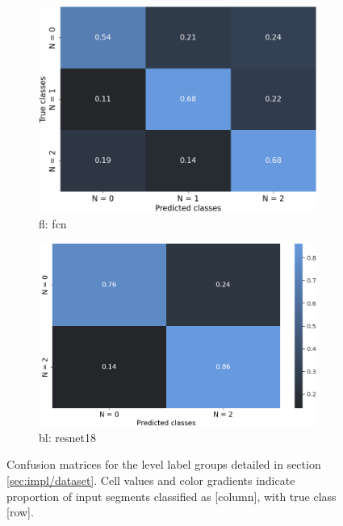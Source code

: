 \begin{figure}[h]
    \begin{subfigure}[b]{0.471\textwidth}
        \centering
        \includegraphics[width=\textwidth]{figures/res_FCN_flevel_cm.png}
        \caption{\acrshort{fl}: \acrlong{fcn}}
        \label{fig:res/conf_flevel}
    \end{subfigure}
    \begin{subfigure}[b]{0.529\textwidth}
        \centering
        \includegraphics[width=\textwidth]{figures/res_ResNet18_blevel_cm.png}
        \caption{\acrshort{bl}: \acrlong{resnet18}}
        \label{fig:res/conf_blevel}
    \end{subfigure}
    \caption{Confusion matrices for the level label groups detailed in section \ref{sec:impl/dataset}. Cell values and color gradients indicate proportion of input segments classified as [column], with true class [row].}
    \label{fig:res/conf_level}
\end{figure}
\FloatBarrier


